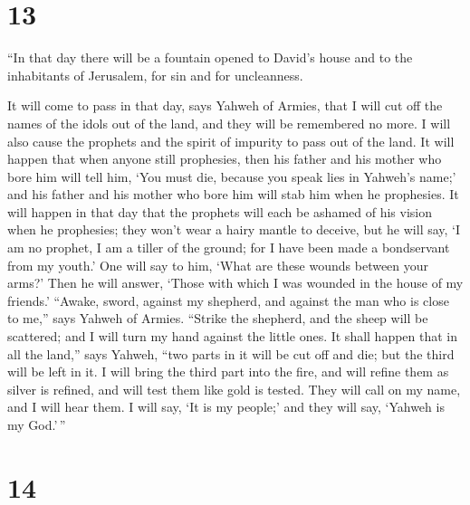 \hypertarget{section-12}{%
\section{13}\label{section-12}}

 ``In that day there will be a fountain opened to David's
house and to the inhabitants of Jerusalem, for sin and for uncleanness.

 It will come to pass in that day, says Yahweh of Armies,
that I will cut off the names of the idols out of the land, and they
will be remembered no more. I will also cause the prophets and the
spirit of impurity to pass out of the land.  It will happen
that when anyone still prophesies, then his father and his mother who
bore him will tell him, `You must die, because you speak lies in
Yahweh's name;' and his father and his mother who bore him will stab him
when he prophesies.  It will happen in that day that the
prophets will each be ashamed of his vision when he prophesies; they
won't wear a hairy mantle to deceive,  but he will say, `I
am no prophet, I am a tiller of the ground; for I have been made a
bondservant from my youth.'  One will say to him, `What are
these wounds between your arms?' Then he will answer, `Those with which
I was wounded in the house of my friends.'  ``Awake, sword,
against my shepherd, and against the man who is close to me,'' says
Yahweh of Armies. ``Strike the shepherd, and the sheep will be
scattered; and I will turn my hand against the little ones. 
It shall happen that in all the land,'' says Yahweh, ``two parts in it
will be cut off and die; but the third will be left in it. 
I will bring the third part into the fire, and will refine them as
silver is refined, and will test them like gold is tested. They will
call on my name, and I will hear them. I will say, `It is my people;'
and they will say, `Yahweh is my God.'\,''

\hypertarget{section-13}{%
\section{14}\label{section-13}}

